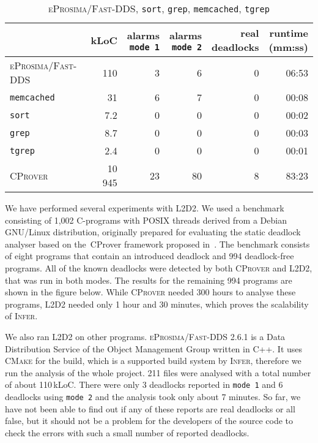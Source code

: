 \documentclass[runningheads]{llncs}
\newcommand{\LLDD}{\textsc{L2D2}\xspace} %
\newcommand{\Infer}{\textsc{Infer}\xspace}
\newcommand{\CProver}{\textsc{CProver}\xspace}
\newcommand{\grep}{\texttt{grep}\xspace}
\newcommand{\sort}{\texttt{sort}\xspace}
\newcommand{\tgrep}{\texttt{tgrep}\xspace}
\newcommand{\memcached}{\texttt{memcached}\xspace}
\newcommand{\eprosimaDDS}{\textsc{eProsima/Fast-DDS}\xspace}
\newcommand{\mOne}{\texttt{mode\,1}\xspace}
\newcommand{\mTwo}{\texttt{mode\,2}\xspace}
\begin{document}
\begin{table}[t]
    \begin{center}
    \caption{\eprosimaDDS, \sort, \grep, \memcached, \tgrep}
    \begin{tabular}{l|r|r|r|r|r}
                     & kLoC & \shortstack{ alarms \\ \mOne } & \shortstack{alarms \\ \mTwo} & \shortstack{real \\ deadlocks} & \shortstack{runtime \\ (mm:ss)} \\ \hline
        \eprosimaDDS & 110 & 3 & 6 & 0 & 06:53 \\
        \memcached   & 31 & 6 & 7 & 0 & 00:08 \\
        \sort        & 7.2 & 0 & 0 & 0 & 00:02 \\
        \grep        & 8.7 & 0 & 0 & 0 & 00:03 \\
        \tgrep       & 2.4 & 0 & 0 & 0 & 00:01 \\

        \CProver     & 10 945 & 23 & 80 & 8 & 83:23 \\
    \end{tabular}
    \end{center}
    \label{tab:my_label}
    \vspace*{-6mm}
\end{table}

We have performed several experiments with \LLDD. We used a benchmark consisting of 1,002 C-programs with POSIX threads derived from a Debian GNU/Linux distribution, originally prepared for evaluating the static deadlock analyser based on the~CProver framework proposed in~\cite{kroening16}.  The benchmark consists of eight programs that contain an introduced deadlock and 994 deadlock-free programs. All of the known deadlocks were detected by both \CProver and \LLDD, that was run in both modes. The results for the remaining 994 programs are shown in the figure below. While \CProver needed 300 hours to analyse these programs, \LLDD needed only 1 hour and 30 minutes, which proves the scalability of \Infer.

We also ran \LLDD on other programs. \eprosimaDDS 2.6.1 is a Data Distribution Service of the Object Management Group written in C++. It uses \textsc{CMake} for the build, which is a supported build system by \Infer, therefore we run the analysis of the whole project. 211 files were analysed with a total number of about 110\,kLoC. There were only 3 deadlocks reported in \mOne and 6 deadlocks using \mTwo and the analysis took only about 7 minutes. So far, we have not been able to find out if any of these reports are real deadlocks or all false, but it should not be a problem for the developers of the source code to check the errors with such a small number of reported deadlocks.
\end{document}
